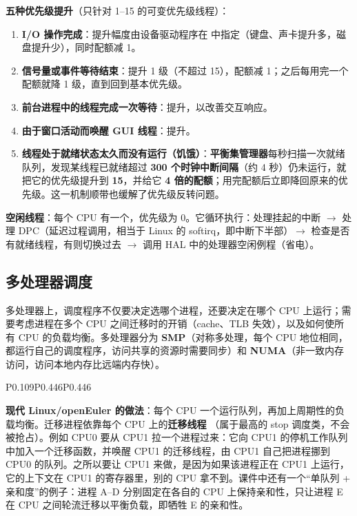 \textbf{五种优先级提升}（只针对 1–15 的可变优先级线程）：
\begin{enumerate}
    \item \textbf{I/O 操作完成}：提升幅度由设备驱动程序在  中指定（键盘、声卡提升多，磁盘提升少），同时配额减 1。
    \item \textbf{信号量或事件等待结束}：提升 1 级（不超过 15），配额减 1；之后每用完一个配额就降 1 级，直到回到基本优先级。
    \item \textbf{前台进程中的线程完成一次等待}：提升，以改善交互响应。
    \item \textbf{由于窗口活动而唤醒 GUI 线程}：提升。
    \item \textbf{线程处于就绪状态太久而没有运行（饥饿）}：\textbf{平衡集管理器}每秒扫描一次就绪队列，发现某线程已就绪超过 \textbf{300 个时钟中断间隔}（约 4 秒）仍未运行，就把它的优先级提升到 \textbf{15}，并给它 \textbf{4 倍的配额}；用完配额后立即降回原来的优先级。这一机制顺带也缓解了优先级反转问题。
\end{enumerate}
\textbf{空闲线程}：每个 CPU 有一个，优先级为 0。它循环执行：处理挂起的中断 $\to$ 处理 DPC（延迟过程调用，相当于 Linux 的 softirq，即中断下半部）$\to$ 检查是否有就绪线程，有则切换过去 $\to$ 调用 HAL 中的处理器空闲例程（省电）。

\subsection{多处理器调度}

多处理器上，调度程序不仅要决定选哪个进程，还要决定在哪个 CPU 上运行；需要考虑进程在多个 CPU 之间迁移时的开销（cache、TLB 失效），以及如何使所有 CPU 的负载均衡。多处理器分为 \textbf{SMP}（对称多处理，每个 CPU 地位相同，都运行自己的调度程序，访问共享的资源时需要同步）和 \textbf{NUMA}（非一致内存访问，访问本地内存比远端内存快）。\par
\begin{btab}{P{0.109}P{0.446}P{0.446}}
\end{btab}
\textbf{现代 Linux/openEuler 的做法}：每个 CPU 一个运行队列，再加上周期性的负载均衡。迁移进程依靠每个 CPU 上的\textbf{迁移线程} （属于最高的 stop 调度类，不会被抢占）。例如 CPU0 要从 CPU1 拉一个进程过来：它向 CPU1 的停机工作队列中加入一个迁移函数，并唤醒 CPU1 的迁移线程，由 CPU1 自己把进程挪到 CPU0 的队列。之所以要让 CPU1 来做，是因为如果该进程正在 CPU1 上运行，它的上下文在 CPU1 的寄存器里，别的 CPU 拿不到。课件中还有一个“单队列 + 亲和度”的例子：进程 A–D 分别固定在各自的 CPU 上保持亲和性，只让进程 E 在 CPU 之间轮流迁移以平衡负载，即牺牲 E 的亲和性。

